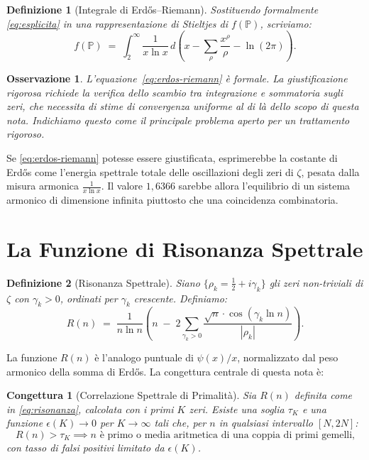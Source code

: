 \documentclass[11pt,a4paper]{article}
\newtheorem{congettura}{Congettura}
\newtheorem{osservazione}{Osservazione}
\newtheorem{definizione}{Definizione}
\begin{document}
\begin{definizione}[Integrale di Erd\H{o}s--Riemann]
Sostituendo formalmente \eqref{eq:esplicita} in una rappresentazione di Stieltjes
di $f(\mathbb{P})$, scriviamo:
\begin{equation}
  f(\mathbb{P}) \;=\; \int_{2}^{\infty} \frac{1}{x \ln x}
  \, d\!\left( x - \sum_{\rho} \frac{x^{\rho}}{\rho} - \ln(2\pi) \right).
  \label{eq:erdos-riemann}
\end{equation}
\end{definizione}

\begin{osservazione}
L'equazione~\eqref{eq:erdos-riemann} \`e formale. La giustificazione rigorosa
richiede la verifica dello scambio tra integrazione e sommatoria sugli zeri, che
necessita di stime di convergenza uniforme al di l\`a dello scopo di questa nota.
Indichiamo questo come il principale problema aperto per un trattamento rigoroso.
\end{osservazione}

Se \eqref{eq:erdos-riemann} potesse essere giustificata, esprimerebbe la costante
di Erd\H{o}s come l'energia spettrale totale delle oscillazioni degli zeri di $\zeta$,
pesata dalla misura armonica $\frac{1}{x \ln x}$. Il valore $1{,}6366$ sarebbe
allora l'equilibrio di un sistema armonico di dimensione infinita piuttosto che una
coincidenza combinatoria.

\section{La Funzione di Risonanza Spettrale}

\begin{definizione}[Risonanza Spettrale]
Siano $\{\rho_k = \frac{1}{2} + i\gamma_k\}$ gli zeri non-triviali di $\zeta$ con
$\gamma_k > 0$, ordinati per $\gamma_k$ crescente. Definiamo:
\begin{equation}
  R(n) \;=\; \frac{1}{n \ln n}
  \left( n \;-\; 2 \sum_{\gamma_k > 0}
  \frac{\sqrt{n} \cdot \cos(\gamma_k \ln n)}{|\rho_k|} \right).
  \label{eq:risonanza}
\end{equation}
\end{definizione}

La funzione $R(n)$ \`e l'analogo puntuale di $\psi(x)/x$, normalizzato dal peso
armonico della somma di Erd\H{o}s. La congettura centrale di questa nota \`e:

\begin{congettura}[Correlazione Spettrale di Primalit\`a]
\label{conj:principale}
Sia $R(n)$ definita come in \eqref{eq:risonanza}, calcolata con i primi $K$ zeri.
Esiste una soglia $\tau_K$ e una funzione $\epsilon(K) \to 0$ per $K \to \infty$
tali che, per $n$ in qualsiasi intervallo $[N, 2N]$:
\[
  R(n) > \tau_K \implies n \text{ \`e primo o media aritmetica di una coppia di primi gemelli,}
\]
con tasso di falsi positivi limitato da $\epsilon(K)$.
\end{congettura}
\end{document}
